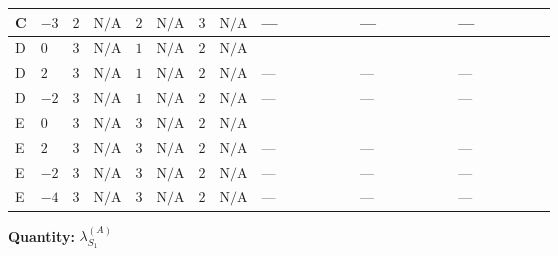 \documentclass[8pt]{article}
\begin{document}
\begin{landscape}
\begin{longtable}{@{}llcccccc >{\raggedright\arraybackslash}p{0.21\linewidth} >{\raggedright\arraybackslash}p{0.21\linewidth} >{\raggedright\arraybackslash}p{0.21\linewidth}@{}}
\midrule
C & $-3$ & $2$ & $\text{N/A}$ & $2$ & $\text{N/A}$ & $3$ & $\text{N/A}$ & --- & --- & --- \\
\midrule
D & $0$ & $3$ & $\text{N/A}$ & $1$ & $\text{N/A}$ & $2$ & $\text{N/A}$ & \scriptsize\adjustbox{max width=\linewidth}{$\begin{gathered} -\frac{4}{3} {\lambda_{X_{5}}^{(1)}} \left({\lambda_{X_{5}}^{(1)}}\right)^{*}\end{gathered}$} & \scriptsize\adjustbox{max width=\linewidth}{$\begin{gathered} -\frac{224}{3} {\lambda_{X_{6}}} \left({\lambda_{X_{6}}}\right)^{*}\end{gathered}$} & \scriptsize\adjustbox{max width=\linewidth}{$\begin{gathered} -\frac{44}{3} {\lambda_{X_{9}}} \left({\lambda_{X_{9}}}\right)^{*}\end{gathered}$} \\
\midrule
D & $2$ & $3$ & $\text{N/A}$ & $1$ & $\text{N/A}$ & $2$ & $\text{N/A}$ & --- & --- & --- \\
\midrule
D & $-2$ & $3$ & $\text{N/A}$ & $1$ & $\text{N/A}$ & $2$ & $\text{N/A}$ & --- & --- & --- \\
\midrule
E & $0$ & $3$ & $\text{N/A}$ & $3$ & $\text{N/A}$ & $2$ & $\text{N/A}$ & \scriptsize\adjustbox{max width=\linewidth}{$\begin{gathered} -\frac{4}{3} {\lambda_{X_{5}}^{(2)}} \left({\lambda_{X_{5}}^{(1)}}\right)^{*}\end{gathered}$} & \scriptsize\adjustbox{max width=\linewidth}{$\begin{gathered} -\frac{224}{3} {\lambda_{X_{6}}} \left({\lambda_{X_{6}}}\right)^{*}\end{gathered}$} & \scriptsize\adjustbox{max width=\linewidth}{$\begin{gathered} -\frac{44}{3} {\lambda_{X_{9}}} \left({\lambda_{X_{9}}}\right)^{*}\end{gathered}$} \\
\midrule
E & $2$ & $3$ & $\text{N/A}$ & $3$ & $\text{N/A}$ & $2$ & $\text{N/A}$ & --- & --- & --- \\
\midrule
E & $-2$ & $3$ & $\text{N/A}$ & $3$ & $\text{N/A}$ & $2$ & $\text{N/A}$ & --- & --- & --- \\
\midrule
E & $-4$ & $3$ & $\text{N/A}$ & $3$ & $\text{N/A}$ & $2$ & $\text{N/A}$ & --- & --- & --- \\
\midrule
\bottomrule
\end{longtable}
\clearpage
\noindent\textbf{Quantity: }$\lambda_{S_1}^{(A)}$\par\smallskip

\end{landscape}
\end{document}
